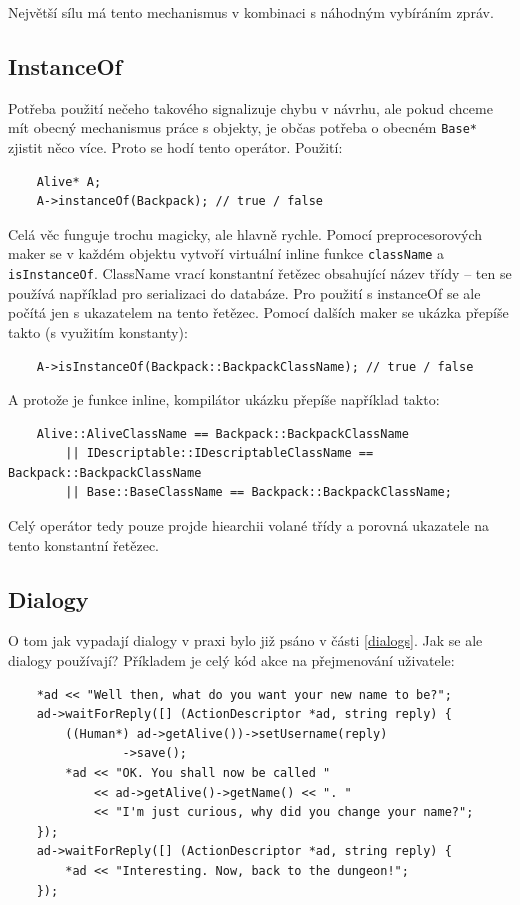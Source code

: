 \documentclass[11pt, a4paper]{article}
\begin{document}
\noindent Největší sílu má tento mechanismus v kombinaci s náhodným vybíráním zpráv.

\subsection{InstanceOf}

Potřeba použití nečeho takového signalizuje chybu v návrhu, ale pokud chceme mít obecný mechanismus práce s objekty, je občas potřeba o obecném \texttt{Base*} zjistit něco více. Proto se hodí tento operátor. Použití:

\begin{lstlisting}
	Alive* A;
	A->instanceOf(Backpack); // true / false
\end{lstlisting}

\noindent Celá věc funguje trochu magicky, ale hlavně rychle. Pomocí preprocesorových maker se v každém objektu vytvoří virtuální inline funkce \texttt{className} a \texttt{isInstanceOf}. ClassName vrací konstantní řetězec obsahující název třídy -- ten se používá například pro serializaci do databáze. Pro použití s instanceOf se ale počítá jen s ukazatelem na tento řetězec. Pomocí dalších maker se ukázka přepíše takto (s využitím konstanty):

\begin{lstlisting}
	A->isInstanceOf(Backpack::BackpackClassName); // true / false
\end{lstlisting}

\noindent A protože je funkce inline, kompilátor ukázku přepíše například takto:

\begin{lstlisting}
	Alive::AliveClassName == Backpack::BackpackClassName 
		|| IDescriptable::IDescriptableClassName == Backpack::BackpackClassName 
		|| Base::BaseClassName == Backpack::BackpackClassName;
\end{lstlisting}

\noindent Celý operátor tedy pouze projde hiearchii volané třídy a porovná ukazatele na tento konstantní řetězec.

\subsection{Dialogy}

O tom jak vypadají dialogy v praxi bylo již psáno v části \ref{dialogs}. Jak se ale dialogy používají? Příkladem je celý kód akce na přejmenování uživatele:

\begin{lstlisting}
	*ad << "Well then, what do you want your new name to be?";
	ad->waitForReply([] (ActionDescriptor *ad, string reply) {
		((Human*) ad->getAlive())->setUsername(reply)
				->save();
		*ad << "OK. You shall now be called " 
			<< ad->getAlive()->getName() << ". "
		    << "I'm just curious, why did you change your name?";
	});
	ad->waitForReply([] (ActionDescriptor *ad, string reply) {
		*ad << "Interesting. Now, back to the dungeon!";
	});
\end{lstlisting}
\end{document}
